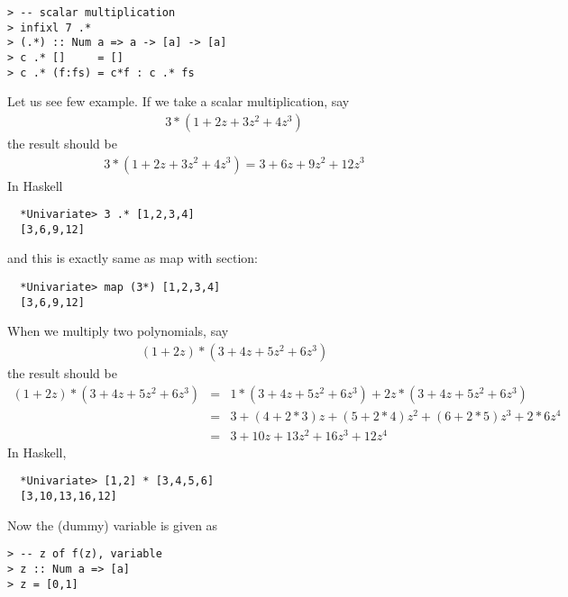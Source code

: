 \documentclass[11pt]{book}
\begin{document}
\begin{verbatim}
> -- scalar multiplication
> infixl 7 .*
> (.*) :: Num a => a -> [a] -> [a]
> c .* []     = []
> c .* (f:fs) = c*f : c .* fs
\end{verbatim}
Let us see few example.
If we take a scalar multiplication, say
\begin{eqnarray}
3 * \left( 1+2z+3z^2+4z^3\right)
\end{eqnarray}
the result should be
\begin{eqnarray}
3 * \left( 1+2z+3z^2+4z^3\right)
=
3+6z+9z^2+12z^3
\end{eqnarray}
In Haskell 
\begin{verbatim}
  *Univariate> 3 .* [1,2,3,4]
  [3,6,9,12]
\end{verbatim}
and this is exactly same as map with section:
\begin{verbatim}
  *Univariate> map (3*) [1,2,3,4]
  [3,6,9,12]
\end{verbatim}
When we multiply two polynomials, say
\begin{eqnarray}
(1+2z) * (3+4z+5z^2+6z^3)
\end{eqnarray}
the result should be
\begin{eqnarray}
\nonumber
(1+2z) * (3+4z+5z^2+6z^3)
&=& 1*(3+4z+5z^2+6z^3) + 2z*(3+4z+5z^2+6z^3) \\
\nonumber
&=& 3+(4+2*3)z+(5+2*4)z^2+(6+2*5)z^3 + 2*6 z^4 \\
&=& 3+ 10z + 13z^2 + 16 z^3 + 12 z^4 
\end{eqnarray}
In Haskell,
\begin{verbatim}
  *Univariate> [1,2] * [3,4,5,6]
  [3,10,13,16,12]
\end{verbatim}

Now the (dummy) variable is given as 
\begin{verbatim}
> -- z of f(z), variable
> z :: Num a => [a]
> z = [0,1]
\end{verbatim}
\end{document}

